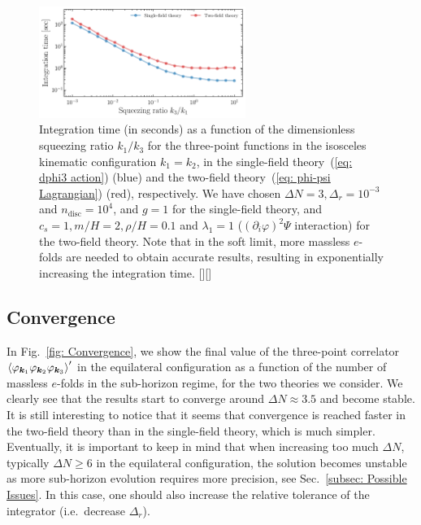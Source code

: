 \documentclass[11pt]{article}
\numberwithin{equation}{section} %
\begin{document}
\begin{figure}[h!]
  \centering
  \includegraphics[width=0.6\textwidth]{Figures/Performances_softlimit.pdf}
  \vspace*{0.2cm}
  \caption{Integration time (in seconds) as a function of the dimensionless squeezing ratio $k_1/k_3$ for the three-point functions in the isosceles kinematic configuration $k_1=k_2$, in the single-field theory~(\ref{eq: dphi3 action}) (\textcolor{pyblue}{blue}) and the two-field theory~(\ref{eq: phi-psi Lagrangian}) (\textcolor{pyred}{red}), respectively. We have chosen $\Delta N = 3, \Delta_r = 10^{-3}$ and $n_{\text{disc}} = 10^4$, and $g=1$ for the single-field theory, and $c_s=1, m/H = 2, \rho/H = 0.1$ and $\lambda_1 = 1$ ($(\partial_i \varphi)^2\Psi$ interaction) for the two-field theory. Note that in the soft limit, more massless $e$-folds are needed to obtain accurate results, resulting in exponentially increasing the integration time. [\href{https://github.com/deniswerth/CosmoFlow/blob/main/CosmoFlow/PhiPsi/Performances.ipynb}{\faGithub}][\href{https://github.com/deniswerth/CosmoFlow/blob/main/CosmoFlow/Massless_dphi3/Performances.ipynb}{\faGithub}]}
  \label{fig: Performances soft limit}
\end{figure}


\subsection{Convergence}

In Fig.~\ref{fig: Convergence}, we show the final value of the three-point correlator $\braket{\varphi_{\bm{k}_1} \varphi_{\bm{k}_2} \varphi_{\bm{k}_3}}'$ in the equilateral configuration as a function of the number of massless $e$-folds in the sub-horizon regime, for the two theories we consider. We clearly see that the results start to converge around $\Delta N \approx 3.5$ and become stable. It is still interesting to notice that it seems that convergence is reached faster in the two-field theory than in the single-field theory, which is much simpler. Eventually, it is important to keep in mind that when increasing too much $\Delta N$, typically $\Delta N\geq 6$ in the equilateral configuration, the solution becomes unstable as more sub-horizon evolution requires more precision, see Sec.~\ref{subsec: Possible Issues}. In this case, one should also increase the relative tolerance of the integrator (i.e.~decrease $\Delta_r$).
\end{document}
